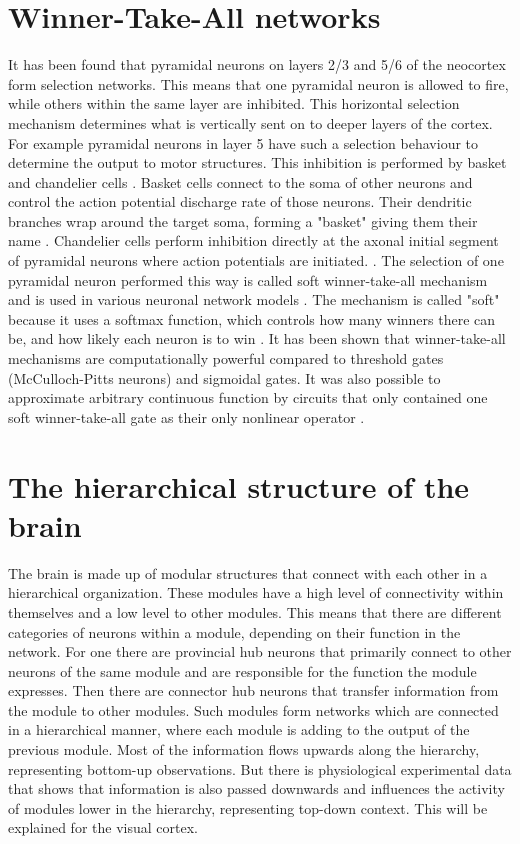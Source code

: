 \section{Winner-Take-All networks}

It has been found that pyramidal neurons on layers 2/3 and 5/6 of the neocortex form selection networks. This means that one pyramidal neuron is allowed to fire, while others within the same layer are inhibited. This horizontal selection mechanism determines what is vertically sent on to deeper layers of the cortex. For example pyramidal neurons in layer 5 have such a selection behaviour to determine the output to motor structures. This inhibition is performed by basket and chandelier cells \citep{softWTA}. Basket cells connect to the soma of other neurons and control the action potential discharge rate of those neurons. Their dendritic branches wrap around the target soma, forming a "basket" giving them their name \citep{basketCells}. Chandelier cells perform inhibition directly at the axonal initial segment of pyramidal neurons where action potentials are initiated. \citep{chandelierCells}. The selection of one pyramidal neuron performed this way is called soft winner-take-all mechanism and is used in various neuronal network models \citep{softWTA}. The mechanism is called "soft" because it uses a softmax function, which controls how many winners there can be, and how likely each neuron is to win \citep{handbookWTA}. It has been shown that winner-take-all mechanisms are computationally powerful compared to threshold gates (McCulloch-Pitts neurons) and sigmoidal gates. It was also possible to approximate arbitrary continuous function by circuits that only contained one soft winner-take-all gate as their only nonlinear operator \cite{WTAPower}.

\section{The hierarchical structure of the brain}

The brain is made up of modular structures that connect with each other in a hierarchical organization. These modules have a high level of connectivity within themselves and a low level to other modules. This means that there are different categories of neurons within a module, depending on their function in the network. For one there are provincial hub neurons that primarily connect to other neurons of the same module and are responsible for the function the module expresses. Then there are connector hub neurons that transfer information from the module to other modules. Such modules form networks which are connected in a hierarchical manner, where each module is adding to the output of the previous module. \citep{hierarchicalBrain}
Most of the information flows upwards along the hierarchy, representing bottom-up observations. But there is physiological experimental data that shows that information is also passed downwards and influences the activity of modules lower in the hierarchy, representing top-down context. This will be explained for the visual cortex.

